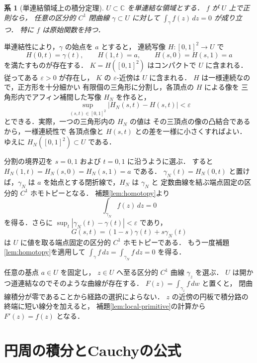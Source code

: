 \documentclass[a5paper,10pt,onecolumn]{jsarticle}
\makeatletter
\theoremstyle{mathnotetheorem}
\newtheorem{corollary}[theorem]{系}
\renewcommand{\proofname}{証明}
\renewenvironment{proof}[1][\proofname]{%
  \par\pushQED{\qed}\normalfont\topsep4\p@\@plus2\p@\relax
  \trivlist\item[\hskip\labelsep\bfseries #1]\ignorespaces
}{\popQED\endtrivlist\@endpefalse}
\makeatother
\begin{document}
\begin{corollary}[単連結領域上の積分定理]\label{cor:simply}
$U\subset\mathbb C$ を単連結な領域とする．
$f$ が $U$ 上で正則なら，
任意の区分的 $C^1$ 閉曲線 $\gamma\subset U$ に対して
$\int_\gamma f(z)\,dz=0$ が成り立つ．
特に $f$ は原始関数を持つ．
\end{corollary}
\begin{proof}
単連結性により，$\gamma$ の始点を $a$ とすると，
連続写像 $H:[0,1]^2\to U$ で
\[
 H(0,t)=\gamma(t),\qquad H(1,t)=a,\qquad
 H(s,0)=H(s,1)=a
\]
を満たすものが存在する．
$K=H([0,1]^2)$ はコンパクトで $U$ に含まれる．
従ってある $\varepsilon>0$ が存在し，
$K$ の $\varepsilon$-近傍は $U$ に含まれる．
$H$ は一様連続なので，正方形を十分細かい
有限個の三角形に分割し，各頂点の $H$ による像を
三角形内でアフィン補間した写像 $H_N$ を作ると，
\[
 \sup_{(s,t)\in[0,1]^2}|H_N(s,t)-H(s,t)|
 <\varepsilon
\]
とできる．実際，一つの三角形内の $H_N$ の値は
その三頂点の像の凸結合であるから，一様連続性で
各頂点像と $H(s,t)$ との差を一様に小さくすればよい．
ゆえに $H_N([0,1]^2)\subset U$ である．

分割の境界辺を $s=0,1$ および $t=0,1$ に沿うように選ぶ．
すると $H_N(1,t)=H_N(s,0)=H_N(s,1)=a$ である．
$\gamma_N(t)=H_N(0,t)$ と置けば，$\gamma_N$ は
$a$ を始点とする閉折線で，$H_N$ は $\gamma_N$ と
定数曲線を結ぶ端点固定の区分的 $C^1$ ホモトピーとなる．
補題\ref{lem:homotopy}より
\[
 \int_{\gamma_N}f(z)\,dz=0
\]
を得る．さらに
$\sup_t|\gamma_N(t)-\gamma(t)|<\varepsilon$ であり，
\[
 G(s,t)=(1-s)\gamma(t)+s\gamma_N(t)
\]
は $U$ に値を取る端点固定の区分的 $C^1$
ホモトピーである．
もう一度補題\ref{lem:homotopy}を適用して
$\int_\gamma f\,dz=\int_{\gamma_N}f\,dz=0$ を得る．

任意の基点 $a\in U$ を固定し，
$z\in U$ へ至る区分的 $C^1$ 曲線 $\gamma_z$ を選ぶ．
$U$ は開かつ道連結なのでそのような曲線が存在する．
$F(z)=\int_{\gamma_z}f\,dw$ と置くと，
閉曲線積分が零であることから経路の選択によらない．
$z$ の近傍の円板で積分路の終端に短い線分を加えると，
補題\ref{lem:local-primitive}の計算から $F'(z)=f(z)$ となる．
\end{proof}

\section{円周の積分とCauchyの公式}
\end{document}
